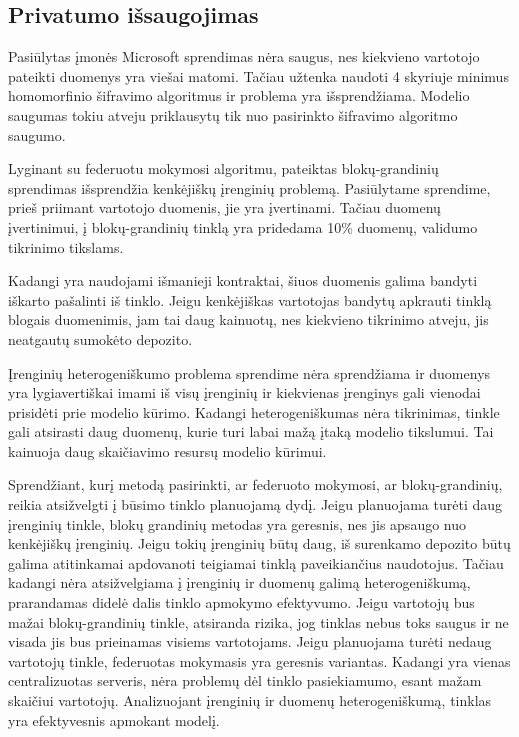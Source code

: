 \documentclass{VUMIFInfBakalaurinis}
\begin{document}
\subsection{Privatumo išsaugojimas}	
\par Pasiūlytas įmonės Microsoft sprendimas nėra saugus, nes kiekvieno vartotojo pateikti duomenys yra viešai matomi. Tačiau užtenka naudoti 4 skyriuje minimus homomorfinio šifravimo algoritmus ir problema yra išsprendžiama. Modelio saugumas tokiu atveju priklausytų tik nuo pasirinkto šifravimo algoritmo saugumo.
\par Lyginant su federuotu mokymosi algoritmu, pateiktas blokų-grandinių sprendimas išsprendžia kenkėjiškų įrenginių problemą. Pasiūlytame sprendime, prieš priimant vartotojo duomenis, jie yra įvertinami. Tačiau duomenų įvertinimui, į blokų-grandinių tinklą yra pridedama 10\% duomenų, validumo tikrinimo tikslams. \par Kadangi yra naudojami išmanieji kontraktai, šiuos duomenis galima bandyti iškarto pašalinti iš tinklo. Jeigu kenkėjiškas vartotojas bandytų apkrauti tinklą blogais duomenimis, jam tai daug kainuotų, nes kiekvieno tikrinimo atveju, jis neatgautų sumokėto depozito.
\par Įrenginių heterogeniškumo problema sprendime nėra sprendžiama ir duomenys yra lygiavertiškai imami iš visų įrenginių ir kiekvienas įrenginys gali vienodai prisidėti prie modelio kūrimo. Kadangi heterogeniškumas nėra tikrinimas, tinkle gali atsirasti daug duomenų, kurie turi labai mažą įtaką modelio tikslumui. Tai kainuoja daug skaičiavimo resursų modelio kūrimui.
\par Sprendžiant, kurį metodą pasirinkti, ar federuoto mokymosi, ar blokų-grandinių, reikia atsižvelgti į būsimo tinklo planuojamą dydį. Jeigu planuojama turėti daug įrenginių tinkle, blokų grandinių metodas yra geresnis, nes jis apsaugo nuo kenkėjiškų įrenginių. Jeigu tokių įrenginių būtų daug, iš surenkamo depozito būtų galima atitinkamai apdovanoti teigiamai tinklą paveikiančius naudotojus. Tačiau kadangi nėra atsižvelgiama į įrenginių ir duomenų galimą heterogeniškumą, prarandamas didelė dalis tinklo apmokymo efektyvumo. Jeigu vartotojų bus mažai blokų-grandinių tinkle, atsiranda rizika, jog tinklas nebus toks saugus ir ne visada jis bus prieinamas visiems vartotojams. Jeigu planuojama turėti nedaug vartotojų tinkle, federuotas mokymasis yra geresnis variantas. Kadangi yra vienas centralizuotas serveris, nėra problemų dėl tinklo pasiekiamumo, esant mažam skaičiui vartotojų. Analizuojant įrenginių ir duomenų heterogeniškumą, tinklas yra efektyvesnis apmokant modelį.  
\end{document}
